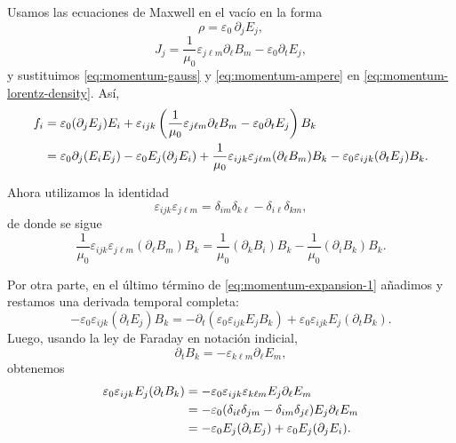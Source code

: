 \documentclass[12pt,a4paper]{article}
\theoremstyle{definition}
\theoremstyle{plain}
\numberwithin{equation}{section}
\theoremstyle{remark}
\begin{document}
Usamos las ecuaciones de Maxwell en el vacío en la forma
\begin{equation}
    \rho=\varepsilon_0\,\partial_jE_j,
    \label{eq:momentum-gauss}
\end{equation}
\begin{equation}
    J_j=\frac{1}{\mu_0}\varepsilon_{j\ell m}\partial_\ell B_m-\varepsilon_0\partial_tE_j,
    \label{eq:momentum-ampere}
\end{equation}
y sustituimos \eqref{eq:momentum-gauss} y \eqref{eq:momentum-ampere} en \eqref{eq:momentum-lorentz-density}. Así,
\begin{align}
    f_i
    &=\varepsilon_0(\partial_jE_j)E_i
    +\varepsilon_{ijk}
    \left(
        \frac{1}{\mu_0}\varepsilon_{j\ell m}\partial_\ell B_m
        -\varepsilon_0\partial_tE_j
    \right)B_k \notag\\
    &=\varepsilon_0\partial_j(E_iE_j)
    -\varepsilon_0E_j(\partial_jE_i)
    +\frac{1}{\mu_0}\varepsilon_{ijk}\varepsilon_{j\ell m}(\partial_\ell B_m)B_k
    -\varepsilon_0\varepsilon_{ijk}(\partial_tE_j)B_k.
    \label{eq:momentum-expansion-1}
\end{align}

Ahora utilizamos la identidad
\begin{equation}
    \varepsilon_{ijk}\varepsilon_{j\ell m}
    =
    \delta_{im}\delta_{k\ell}
    -
    \delta_{i\ell}\delta_{km},
    \label{eq:momentum-levicivita}
\end{equation}
de donde se sigue
\begin{equation}
    \frac{1}{\mu_0}\varepsilon_{ijk}\varepsilon_{j\ell m}(\partial_\ell B_m)B_k
    =
    \frac{1}{\mu_0}(\partial_kB_i)B_k
    -
    \frac{1}{\mu_0}(\partial_iB_k)B_k.
    \label{eq:momentum-magnetic-part}
\end{equation}

Por otra parte, en el último término de \eqref{eq:momentum-expansion-1} añadimos y restamos una derivada temporal completa:
\begin{equation}
    -\varepsilon_0\varepsilon_{ijk}(\partial_tE_j)B_k
    =
    -\partial_t\!\left(\varepsilon_0\varepsilon_{ijk}E_jB_k\right)
    +
    \varepsilon_0\varepsilon_{ijk}E_j(\partial_tB_k).
    \label{eq:momentum-time-product}
\end{equation}
Luego, usando la ley de Faraday en notación indicial,
\begin{equation}
    \partial_tB_k=-\varepsilon_{k\ell m}\partial_\ell E_m,
    \label{eq:momentum-faraday}
\end{equation}
obtenemos
\begin{align}
    \varepsilon_0\varepsilon_{ijk}E_j(\partial_tB_k)
    &=
    -\varepsilon_0\varepsilon_{ijk}\varepsilon_{k\ell m}E_j\partial_\ell E_m \notag\\
    &=
    -\varepsilon_0
    (\delta_{i\ell}\delta_{jm}-\delta_{im}\delta_{j\ell})
    E_j\partial_\ell E_m \notag\\
    &=
    -\varepsilon_0E_j(\partial_iE_j)
    +
    \varepsilon_0E_j(\partial_jE_i).
    \label{eq:momentum-electric-correction}
\end{align}
\end{document}
